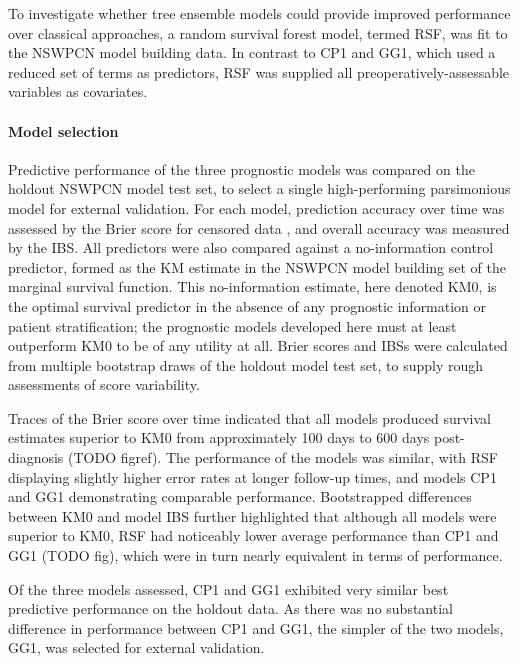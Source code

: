 \documentclass[dissertation.tex]{subfiles}
\begin{document}
To investigate whether tree ensemble models could provide improved performance over classical approaches, a random survival forest model, termed RSF, was fit to the \gls{NSWPCN} model building data.  In contrast to CP1 and GG1, which used a reduced set of terms as predictors, RSF was supplied all preoperatively-assessable variables as covariates.

\paragraph{Model selection}
Predictive performance of the three prognostic models was compared on the holdout \gls{NSWPCN} model test set, to select a single high-performing parsimonious model for external validation.  For each model, prediction accuracy over time was assessed by the Brier score for censored data \cite{Graf1999}, and overall accuracy was measured by the \gls{IBS}.  All predictors were also compared against a no-information control predictor, formed as the \gls{KM} estimate in the \gls{NSWPCN} model building set of the marginal survival function.  This no-information estimate, here denoted KM0, is the optimal survival predictor in the absence of any prognostic information or patient stratification; the prognostic models developed here must at least outperform KM0 to be of any utility at all.  Brier scores and \glspl{IBS} were calculated from multiple bootstrap draws of the holdout model test set, to supply rough assessments of score variability.

Traces of the Brier score over time indicated that all models produced survival estimates superior to KM0 from approximately 100 days to 600 days post-diagnosis (TODO figref).  The performance of the models was similar, with RSF displaying slightly higher error rates at longer follow-up times, and models CP1 and GG1 demonstrating comparable performance.  Bootstrapped differences between KM0 and model \Gls{IBS} further highlighted that although all models were superior to KM0, RSF had noticeably lower average performance than CP1 and GG1 (TODO fig), which were in turn nearly equivalent in terms of performance.

Of the three models assessed, CP1 and GG1 exhibited very similar best predictive performance on the holdout data.  As there was no substantial difference in performance between CP1 and GG1, the simpler of the two models, GG1, was selected for external validation.
\end{document}

